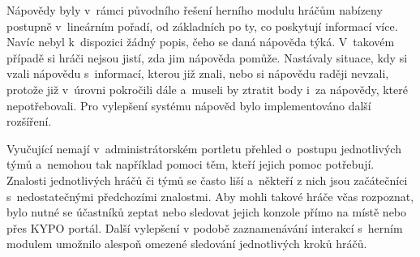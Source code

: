 \documentclass[
  digital, %
  oneside, %
  table,   %
  nolof,     %
  nolot,     %
  nocover
]{fithesis3}
\begin{document}
Nápovědy byly v~rámci původního řešení herního modulu hráčům nabízeny postupně v~lineárním pořadí, od základních po ty, co poskytují informací více. Navíc nebyl k~dispozici žádný popis, čeho se daná nápověda týká. V~takovém případě si hráči nejsou jistí, zda jim nápověda pomůže. Nastávaly situace, kdy si vzali nápovědu s~informací, kterou již znali, nebo si nápovědu raději nevzali, protože již v~úrovni pokročili dále a~museli by ztratit body i~za nápovědy, které nepotřebovali. Pro vylepšení systému nápověd bylo implementováno další rozšíření.\par
Vyučující nemají v~administrátorském portletu přehled o~postupu jednotlivých týmů a~nemohou tak například pomoci těm, kteří jejich pomoc potřebují. Znalosti jednotlivých hráčů či týmů se často liší a~někteří z nich jsou začátečníci s~nedostatečnými předchozími znalostmi. Aby mohli takové hráče včas rozpoznat, bylo nutné se účastníků zeptat nebo sledovat jejich konzole přímo na místě nebo přes KYPO portál. Další vylepšení v podobě zaznamenávání interakcí s~herním modulem umožnilo alespoň omezené sledování jednotlivých kroků hráčů. \cite{ctfDesign}
\end{document}
